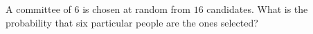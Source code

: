 A committee of $6$ is chosen at random from $16$ candidates. What is the probability that six particular people are the ones selected?

